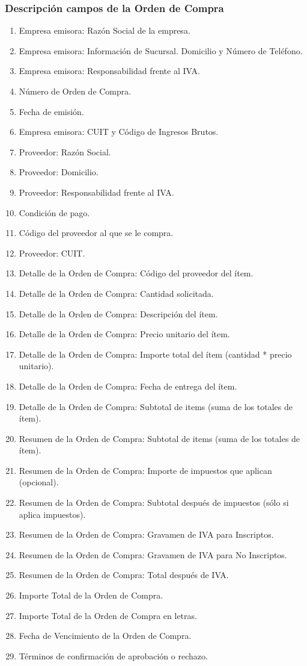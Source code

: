 \subsubsection{Descripci\'on campos de la Orden de Compra}
\begin{enumerate}
  \item Empresa emisora: Raz\'on Social de la empresa.
  \item Empresa emisora: Informaci\'on de Sucursal. Domicilio y N\'umero de Tel\'efono.
  \item Empresa emisora: Responsabilidad frente al IVA.
  \item Número de Orden de Compra.
  \item Fecha de emisi\'on.
  \item Empresa emisora: CUIT y C\'odigo de Ingresos Brutos.
  \item Proveedor: Raz\'on Social.
  \item Proveedor: Domicilio.
  \item Proveedor: Responsabilidad frente al IVA.
  \item Condici\'on de pago.
  \item C\'odigo del proveedor al que se le compra.
  \item Proveedor: CUIT.
  \item Detalle de la Orden de Compra: C\'odigo del proveedor del \'item.
  \item Detalle de la Orden de Compra: Cantidad solicitada.
  \item Detalle de la Orden de Compra: Descripci\'on del \'item.
  \item Detalle de la Orden de Compra: Precio unitario del \'item.
  \item Detalle de la Orden de Compra: Importe total del \'item (cantidad * precio unitario).
  \item Detalle de la Orden de Compra: Fecha de entrega del \'item.
  \item Detalle de la Orden de Compra: Subtotal de items (suma de los totales de \'item).
  \item Resumen de la Orden de Compra: Subtotal de items (suma de los totales de \'item).
  \item Resumen de la Orden de Compra: Importe de impuestos que aplican (opcional).
  \item Resumen de la Orden de Compra: Subtotal después de impuestos (sólo si aplica impuestos).
  \item Resumen de la Orden de Compra: Gravamen de IVA para Inscriptos.
  \item Resumen de la Orden de Compra: Gravamen de IVA para No Inscriptos.
  \item Resumen de la Orden de Compra: Total después de IVA.
  \item Importe Total de la Orden de Compra.
  \item Importe Total de la Orden de Compra en letras.
  \item Fecha de Vencimiento de la Orden de Compra.
  \item Términos de confirmación de aprobación o rechazo.
\end{enumerate}

